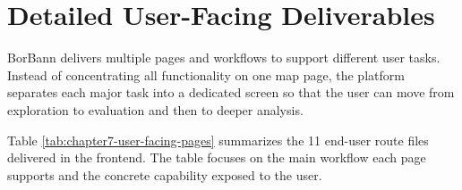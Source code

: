\section{Detailed User-Facing Deliverables}

BorBann delivers multiple pages and workflows to support different user tasks. Instead of concentrating all functionality on one map page, the platform separates each major task into a dedicated screen so that the user can move from exploration to evaluation and then to deeper analysis.

Table \ref{tab:chapter7-user-facing-pages} summarizes the 11 end-user route files delivered in the frontend. The table focuses on the main workflow each page supports and the concrete capability exposed to the user.

